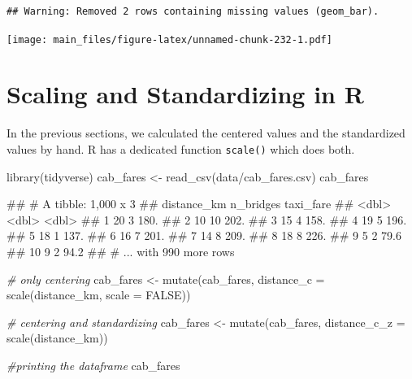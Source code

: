 \documentclass[
]{book}
\newenvironment{Shaded}{\begin{snugshade}}{\end{snugshade}}
\newcommand{\AttributeTok}[1]{\textcolor[rgb]{0.77,0.63,0.00}{#1}}
\newcommand{\CommentTok}[1]{\textcolor[rgb]{0.56,0.35,0.01}{\textit{#1}}}
\newcommand{\ConstantTok}[1]{\textcolor[rgb]{0.00,0.00,0.00}{#1}}
\newcommand{\FunctionTok}[1]{\textcolor[rgb]{0.00,0.00,0.00}{#1}}
\newcommand{\NormalTok}[1]{#1}
\newcommand{\OtherTok}[1]{\textcolor[rgb]{0.56,0.35,0.01}{#1}}
\newcommand{\StringTok}[1]{\textcolor[rgb]{0.31,0.60,0.02}{#1}}
\begin{document}
\begin{verbatim}
## Warning: Removed 2 rows containing missing values (geom_bar).
\end{verbatim}

\texttt{[image: main\_files/figure-latex/unnamed-chunk-232-1.pdf]}

\hypertarget{scaling-and-standardizing-in-r}{%
\section{Scaling and Standardizing in R}\label{scaling-and-standardizing-in-r}}

In the previous sections, we calculated the centered values and the standardized values by hand. R has a dedicated function \texttt{scale()} which does both.

\begin{Shaded}
\begin{Highlighting}[]
\FunctionTok{library}\NormalTok{(tidyverse)}
\NormalTok{cab\_fares }\OtherTok{\textless{}{-}} \FunctionTok{read\_csv}\NormalTok{(}\StringTok{\textquotesingle{}data/cab\_fares.csv\textquotesingle{}}\NormalTok{)}
\NormalTok{cab\_fares}
\end{Highlighting}
\end{Shaded}

\begin{Shaded}
\begin{Highlighting}[]
\NormalTok{\#\# \# A tibble: 1,000 x 3}
\NormalTok{\#\#    distance\_km n\_bridges taxi\_fare}
\NormalTok{\#\#          \textless{}dbl\textgreater{}     \textless{}dbl\textgreater{}     \textless{}dbl\textgreater{}}
\NormalTok{\#\#  1          20         3     180. }
\NormalTok{\#\#  2          10        10     202. }
\NormalTok{\#\#  3          15         4     158. }
\NormalTok{\#\#  4          19         5     196. }
\NormalTok{\#\#  5          18         1     137. }
\NormalTok{\#\#  6          16         7     201. }
\NormalTok{\#\#  7          14         8     209. }
\NormalTok{\#\#  8          18         8     226. }
\NormalTok{\#\#  9           5         2      79.6}
\NormalTok{\#\# 10           9         2      94.2}
\NormalTok{\#\# \# ... with 990 more rows}
\end{Highlighting}
\end{Shaded}

\begin{Shaded}
\begin{Highlighting}[]
\CommentTok{\# only centering}
\NormalTok{cab\_fares }\OtherTok{\textless{}{-}} \FunctionTok{mutate}\NormalTok{(cab\_fares, }\AttributeTok{distance\_c =} \FunctionTok{scale}\NormalTok{(distance\_km, }\AttributeTok{scale =} \ConstantTok{FALSE}\NormalTok{))}

\CommentTok{\# centering and standardizing}
\NormalTok{cab\_fares }\OtherTok{\textless{}{-}} \FunctionTok{mutate}\NormalTok{(cab\_fares, }\AttributeTok{distance\_c\_z =} \FunctionTok{scale}\NormalTok{(distance\_km))}

\CommentTok{\#printing the dataframe}
\NormalTok{cab\_fares}
\end{Highlighting}
\end{Shaded}
\end{document}
